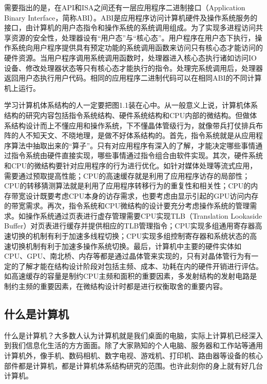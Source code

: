 \documentclass[]{ctexbook}
\begin{document}
需要指出的是，在API和ISA之间还有一层应用程序二进制接口（Application Binary Interface，简称ABI）。ABI是应用程序访问计算机硬件及操作系统服务的接口，由计算机的用户态指令和操作系统的系统调用组成。为了实现多进程访问共享资源的安全性，处理器设有``用户态''与``核心态''。用户程序在用户态下执行，操作系统向用户程序提供具有预定功能的系统调用函数来访问只有核心态才能访问的硬件资源。当用户程序调用系统调用函数时，处理器进入核心态执行诸如访问IO设备、修改处理器状态等只有核心态才能执行的指令。处理完系统调用后，处理器返回用户态执行用户代码。相同的应用程序二进制代码可以在相同ABI的不同计算机上运行。

学习计算机体系结构的人一定要把图1.1装在心中。从一般意义上说，计算机体系结构的研究内容包括指令系统结构、硬件系统结构和CPU内部的微结构。但做体系结构设计而上不懂应用和操作系统，下不懂晶体管级行为，就像带兵打仗排兵布阵的人不知天文、不晓地理，是做不好体系结构的。首先，指令系统就是从应用程序算法中抽取出来的``算子''。只有对应用程序有深入的了解，才能决定哪些事情通过指令系统由硬件直接实现，哪些事情通过指令组合由软件实现。其次，硬件系统和CPU的微结构要针对应用程序的行为进行优化。如针对媒体处理等流式应用，需要通过预取提高性能；CPU的高速缓存就是利用了应用程序访存的局部性；CPU的转移猜测算法就是利用了应用程序转移行为的重复性和相关性；CPU的内存带宽设计既要考虑CPU本身的访存需求，也要考虑由显示引起的GPU访问内存的带宽需求。再次，指令系统和CPU微结构的设计要充分考虑操作系统的管理需求。如操作系统通过页表进行虚存管理需要CPU实现TLB（Translation Lookaside Buffer）对页表进行缓存并提供相应的TLB管理指令；CPU实现多组通用寄存器高速切换的机制有利于加速多线程切换；CPU实现多组控制寄存器和系统状态的高速切换机制有利于加速多操作系统切换。最后，计算机中主要的硬件实体如CPU、GPU、南北桥、内存等都是通过晶体管来实现的，只有对晶体管行为有一定的了解才能在结构设计阶段对包括主频、成本、功耗在内的硬件开销进行评估。如高速缓存的容量是制约CPU主频和面积的重要因素，多发射结构的发射电路是制约主频的重要因素，在微结构设计时都是进行权衡取舍的重要内容。

\hypertarget{ux4ec0ux4e48ux662fux8ba1ux7b97ux673a}{%
\subsection{什么是计算机}\label{ux4ec0ux4e48ux662fux8ba1ux7b97ux673a}}

什么是计算机？大多数人认为计算机就是我们桌面的电脑，实际上计算机已经深入到我们信息化生活的方方面面。除了大家熟知的个人电脑、服务器和工作站等通用计算机外，像手机、数码相机、数字电视、游戏机、打印机、路由器等设备的核心部件都是计算机，都是计算机体系结构研究的范围。也许此刻你的身上就有好几台计算机。
\end{document}
